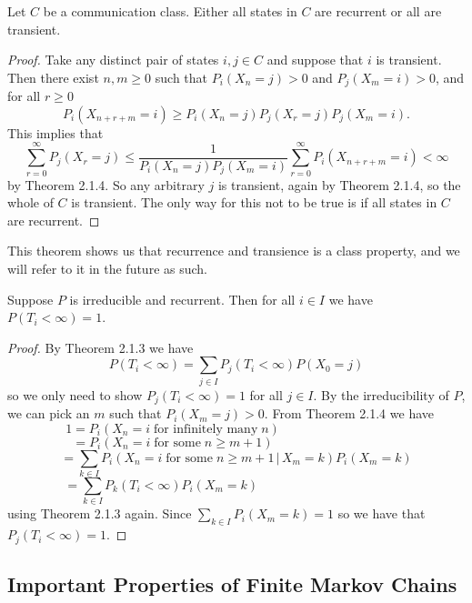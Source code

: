 \begin{thm} Let $C$ be a communication class. Either all states in $C$ are recurrent or all are transient.
\end{thm}

\begin{proof} Take any distinct pair of states $i,j \in C$ and suppose that $i$ is transient. Then there exist $n,m\geq0$ such that $P_i(X_n=j)>0$ and $P_j(X_m=i)>0$, and for all $r\geq0$
\[P_i(X_{n+r+m}=i) \geq P_i(X_n=j)P_j(X_r=j)P_j(X_m=i).\]
This implies that
\[\sum_{r=0}^{\infty}P_j(X_r=j)\leq \frac{1}{P_i(X_n=j)P_j(X_m=i)}\sum_{r=0}^{\infty}P_i(X_{n+r+m}=i)<\infty \]
by Theorem 2.1.4. So any arbitrary $j$ is transient, again by Theorem 2.1.4, so the whole of $C$ is transient. The only way for this not to be true is if all states in $C$ are recurrent.
\end{proof}
This theorem shows us that recurrence and transience is a class property, and we will refer to it in the future as such.

\begin{thm} Suppose $P$ is irreducible and recurrent. Then for all $i \in I$ we have $P(T_i<\infty)=1$.
\end{thm}
\begin{proof} By Theorem 2.1.3 we have
\[P(T_i<\infty)=\sum_{j\in I}P_j(T_i<\infty)P(X_0=j)\]
so we only need to show $P_j(T_i<\infty)=1$ for all $j \in I$. By the irreducibility of $P$, we can pick an $m$ such that $P_i(X_m=j)>0$. From Theorem 2.1.4 we have
\[\!\!\!\!\!\!\!1=P_i(X_n=i \; \textrm{for infinitely many} \; n)\qquad\qquad\qquad\qquad\qquad\]
\[\!\!\!\!\!\!=P_i(X_n=i \; \textrm{for some} \; n\geq m+1)\qquad\qquad\qquad\qquad\qquad\]
\[=\sum_{k \in I} P_i(X_n=i \; \textrm{for some} \; n\geq m+1\,|\, X_m=k)P_i(X_m=k)\]
\[\!\!\!\!\,=\sum_{k \in I} P_k(T_i<\infty)P_i(X_m=k)\qquad\qquad\qquad\qquad\qquad\qquad\]
using Theorem 2.1.3 again. Since $\sum_{k \in I} P_i(X_m=k)=1$ so we have that \\$P_j(T_i<\infty)=1$.
\end{proof}

\subsection{Important Properties of Finite Markov Chains}

